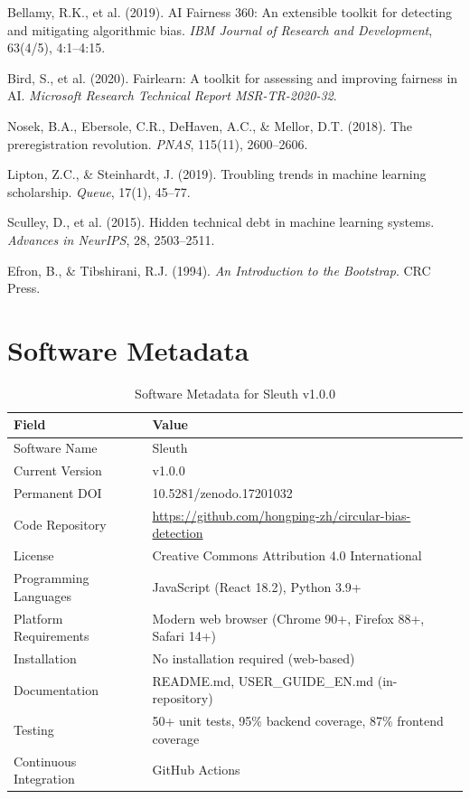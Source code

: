 \documentclass[10pt]{article}
\begin{document}
\begin{thebibliography}{99}
Bellamy, R.K., et al. (2019). AI Fairness 360: An extensible toolkit for detecting and mitigating algorithmic bias. \textit{IBM Journal of Research and Development}, 63(4/5), 4:1--4:15.

Bird, S., et al. (2020). Fairlearn: A toolkit for assessing and improving fairness in AI. \textit{Microsoft Research Technical Report MSR-TR-2020-32}.

Nosek, B.A., Ebersole, C.R., DeHaven, A.C., \& Mellor, D.T. (2018). The preregistration revolution. \textit{PNAS}, 115(11), 2600--2606.

Lipton, Z.C., \& Steinhardt, J. (2019). Troubling trends in machine learning scholarship. \textit{Queue}, 17(1), 45--77.

Sculley, D., et al. (2015). Hidden technical debt in machine learning systems. \textit{Advances in NeurIPS}, 28, 2503--2511.

Efron, B., \& Tibshirani, R.J. (1994). \textit{An Introduction to the Bootstrap}. CRC Press.

\end{thebibliography}

\appendix

\section*{Software Metadata}

\begin{table}[h]
\centering
\caption{Software Metadata for Sleuth v1.0.0}
\begin{tabular}{ll}
\toprule
\textbf{Field} & \textbf{Value} \\
\midrule
Software Name & Sleuth \\
Current Version & v1.0.0 \\
Permanent DOI & 10.5281/zenodo.17201032 \\
Code Repository & \url{https://github.com/hongping-zh/circular-bias-detection} \\
License & Creative Commons Attribution 4.0 International \\
Programming Languages & JavaScript (React 18.2), Python 3.9+ \\
Platform Requirements & Modern web browser (Chrome 90+, Firefox 88+, Safari 14+) \\
Installation & No installation required (web-based) \\
Documentation & README.md, USER\_GUIDE\_EN.md (in-repository) \\
Testing & 50+ unit tests, 95\% backend coverage, 87\% frontend coverage \\
Continuous Integration & GitHub Actions \\
\bottomrule
\end{tabular}
\end{table}
\end{document}
